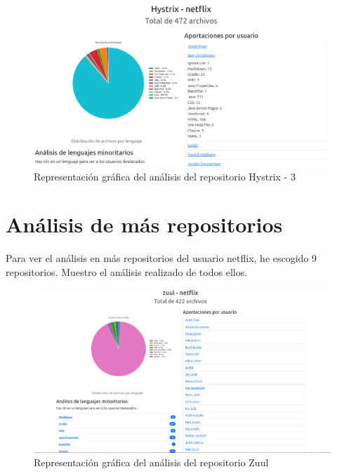 \documentclass[a4paper, 12pt]{book}
\begin{document}
\begin{figure}[H]
  \centering
  \includegraphics[width=1\textwidth]{img/analisishystrix3.png}
  \caption{Representación gráfica del análisis del repositorio Hystrix - 3}
  \label{figura:analisishystrix3}
\end{figure}

\section{Análisis de más repositorios}
\label{sec:Análisis de más repositorios}

Para ver el análisis en más repositorios del usuario netflix, he escogido 9 repositorios. Muestro el análisis realizado de todos ellos.

\begin{figure}[H]
  \centering
  \includegraphics[width=1\textwidth]{img/zuul.png}
  \caption{Representación gráfica del análisis del repositorio Zuul}
  \label{figura:analisiszuul}
\end{figure}
\end{document}
